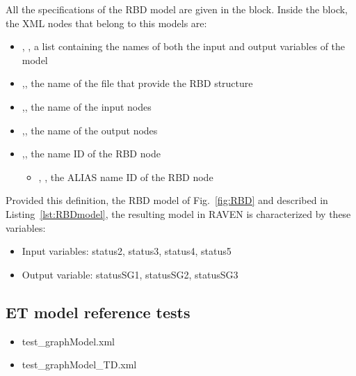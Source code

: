 All the specifications of the RBD model are given in the 
 block. 
Inside the  block, the XML
nodes that belong to this models are:
\begin{itemize}
  \item  {}, , a list containing the names of both the input and output variables of the model
  \item  {},, the name of the file that provide the RBD structure
  \item  {},, the name of the input nodes
  \item  {},, the name of the output nodes
  \item  {},, the name ID of the RBD node
	  \begin{itemize}
	    \item {}, , the ALIAS name ID of the RBD node
	  \end{itemize}
\end{itemize}

Provided this definition, the RBD model of Fig.~\ref{fig:RBD} and described in Listing~\ref{lst:RBDmodel}, 
the resulting model in RAVEN is characterized by these variables:
\begin{itemize}
	\item Input variables: status2, status3, status4, status5
	\item Output variable: statusSG1, statusSG2, statusSG3
\end{itemize}

\subsection{ET model reference tests}
\begin{itemize}
	\item test\_graphModel.xml
	\item test\_graphModel\_TD.xml
\end{itemize}